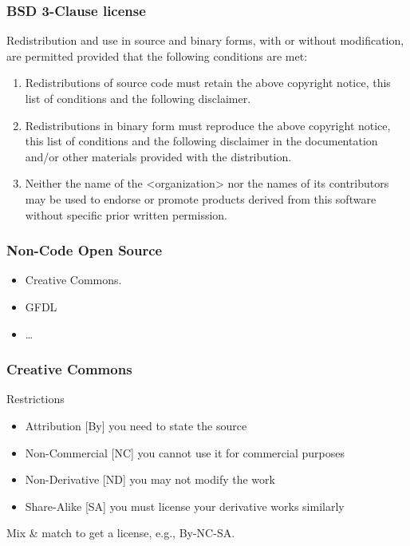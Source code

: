 \begin{frame}[fragile]
\frametitle{BSD 3-Clause license}

Redistribution and use in source and binary forms, with or without
modification, are permitted provided that the following conditions are met:
\begin{enumerate}
\item Redistributions of source code must retain the above copyright notice, this list of conditions and the following disclaimer.
\item Redistributions in binary form must reproduce the above copyright notice, this list of conditions and the following disclaimer in the documentation and/or other materials provided with the distribution.
\item Neither the name of the <organization> nor the names of its contributors may be used to endorse or promote products derived from this software without specific prior written permission.
\end{enumerate}

\end{frame}

\begin{frame}[fragile]
\frametitle{Non-Code Open Source}

\begin{itemize}
\item Creative Commons.
\item GFDL
\item \ldots
\end{itemize}
\end{frame}

\begin{frame}[fragile]
\frametitle{Creative Commons}

\begin{block}{Restrictions}
\begin{itemize}
\item \alert{Attribution} [By] you need to state the source
\item \alert{Non-Commercial} [NC] you cannot use it for commercial purposes
\item \alert{Non-Derivative} [ND] you may not modify the work
\item \alert{Share-Alike} [SA] you must license your derivative works similarly 
\end{itemize}
\end{block}

Mix \& match to get a license, e.g., By-NC-SA.
\end{frame}


